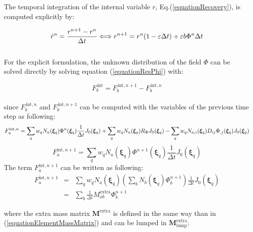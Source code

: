 \documentclass[oneside,11pt,times]{book}
\begin{document}
The temporal integration of the internal variable $r$, Eq.(\ref{equationRecovery}), is computed explicitly by:

\begin{equation}
\begin{aligned}
\centering
\dot{r}^{n}=\frac{r^{n+1}-r^{n}}{\Delta t} \Longleftrightarrow   r^{n+1}=r^n (1-\varepsilon \Delta t) + \varepsilon b \Phi^n \Delta t
\end{aligned}
\label{equationrtimeExp}
\end{equation}
\\

For the explicit formulation, the unknown distribution of the field $\Phi$ can be solved directly by solving equation (\ref{equationResPhi}) with:

%
\begin{equation} \label{equationResPhiExpl}
{F}_{b}^{\,\text{int}} =  {F}_{b}^{\,\text{int}, n+1} - {F}_{b}^{\,\text{int}, n}
\end{equation}
%
\\
since ${F}_{b}^{\,\text{int},n}$ and ${F}_{b}^{\,\text{int},n+1}$ can be computed with the variables of the previous time step as following:
\begin{equation}
\begin{aligned}
\centering
{F}^{\text{int},n}_a=\sum_q w_q N_a(\bm{\xi}_q) \Phi^n (\bm{\xi}_q)\frac{1}{\Delta t}J_0(\bm{\xi}_q)  + \sum_q w_q  N_a(\bm{\xi}_q) R_{\Phi} J_0(\bm{\xi}_q)- \sum_q w_q  N_{a,i}(\bm{\xi}_q) D_{ij} \Phi_{,j}(\bm{\xi}_q) J_0(\bm{\xi}_q)
\end{aligned}
\label{equationFintN}
\end{equation}
\begin{equation}
{F}^{\text{int},n+1}_a  = \sum_q w_q N_a(\bm{\xi}_q) \Phi^{n+1} (\bm{\xi}_q)\frac{1}{\Delta t}J_0(\bm{\xi}_q)
\label{equationFintNN}
\end{equation}
The term ${F}^{\text{int},n+1}_a$ can be written as following:
\begin{eqnarray}
{F}^{\text{int},n+1}_a & = & \sum_q w_q N_a(\bm{\xi}_q) \left(\sum_b N_b(\bm{\xi}_q) \Phi_{b}^{n+1} \right)\frac{1}{\Delta t}J_0(\bm{\xi}_q)\\
& = & \sum_b \frac{1}{\Delta t} M_{ab}^{\text{extra}} \Phi_{b}^{n+1}
\label{eq:equationFintNN2}
\end{eqnarray}

where the extra mass matrix $\bm{M}^{\text{extra}}$ is defined in the same way than in (\ref{equationElementMassMatrix}) and can be lumped in $\bm{M}_{\text{lump}}^{\text{extra}}$:
\end{document}
